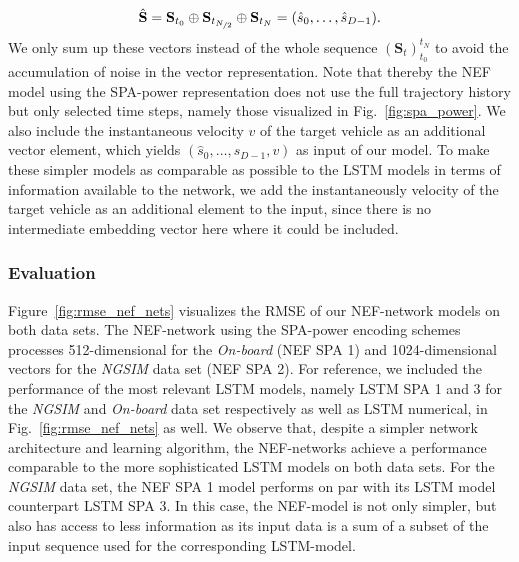 \begin{equation}
  \hat{\mathbf{S}} =  \mathbf{S}_{t_0} \oplus \mathbf{S}_{t_{\nicefrac{N}{2}}} \oplus \mathbf{S}_{t_N} = (\hat{s}_0, \ldots, \hat{s}_{D-1}).
\end{equation}
We only sum up these vectors instead of the whole sequence $(\mathbf{S}_{t})_{t_0}^{t_N}$ to avoid the accumulation of noise in the vector representation.
Note that thereby the \ac{NEF} model using the \ac{SPA}-power representation does not use the full trajectory history but only selected time steps, namely those visualized in Fig.~\ref{fig:spa_power}.
We also include the instantaneous velocity $v$ of the target vehicle as an additional vector element, which yields $(\hat{s}_0, \ldots, \hat{s}_{D-1}, v)$ as input of our model.
To make these simpler models as comparable as possible to the \ac{LSTM} models in terms of information available to the network, we add the instantaneously velocity of the target vehicle as an additional element to the input, since there is no intermediate embedding vector here where it could be included.

\subsubsection{Evaluation}%
\label{ssubsec:evaluation_nef}

Figure~\ref{fig:rmse_nef_nets} visualizes the \ac{RMSE} of our \ac{NEF}-network models on both data sets.
The \ac{NEF}-network using the \ac{SPA}-power encoding schemes processes \num{512}-dimensional for the \emph{On-board} (\ac{NEF} \ac{SPA} \num{1}) and \num{1024}-dimensional vectors for the \emph{\ac{NGSIM}} data set (\ac{NEF} \ac{SPA} \num{2}).
For reference, we included the performance of the most relevant \ac{LSTM} models, namely \ac{LSTM} \ac{SPA} \num{1} and \num{3} for the \emph{\ac{NGSIM}} and \emph{On-board} data set respectively as well as \ac{LSTM} numerical, in Fig.~\ref{fig:rmse_nef_nets} as well.
We observe that, despite a simpler network architecture and learning algorithm, the \ac{NEF}-networks achieve a performance comparable to the more sophisticated \ac{LSTM} models on both data sets.
For the \emph{\ac{NGSIM}} data set, the \ac{NEF} \ac{SPA} \num{1} model performs on par with its \ac{LSTM} model counterpart \ac{LSTM} \ac{SPA} \num{3}.
In this case, the \ac{NEF}-model is not only simpler, but also has access to less information as its input data is a sum of a subset of the input sequence used for the corresponding \ac{LSTM}-model.

